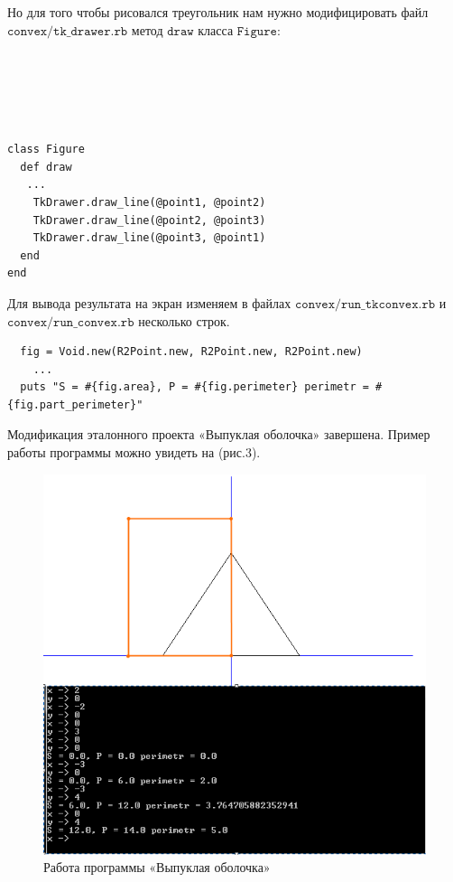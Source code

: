 Но для того чтобы рисовался треугольник нам нужно модифицировать файл $\texttt{convex/tk\_drawer.rb}$ 
метод $\texttt{draw}$ класса $\texttt{Figure}$:
\begin{small}
\begin{verbatim}





class Figure
  def draw
   ...
    TkDrawer.draw_line(@point1, @point2)
    TkDrawer.draw_line(@point2, @point3)
    TkDrawer.draw_line(@point3, @point1)
  end
end
\end{verbatim}
\end{small}

Для вывода результата на экран изменяем в файлах $\texttt{convex/run\_tkconvex.rb}$ и $\texttt{convex/run\_convex.rb}$ несколько строк.


\begin{small}
\begin{verbatim}
  fig = Void.new(R2Point.new, R2Point.new, R2Point.new)
    ...
  puts "S = #{fig.area}, P = #{fig.perimeter} perimetr = #{fig.part_perimeter}"
\end{verbatim}
\end{small}

Модификация эталонного проекта «Выпуклая оболочка» завершена. Пример работы программы можно увидеть на (рис.3).

\begin{figure}[ht!]
\begin{center}
\includegraphics[width=0.8\hsize]{images/3}
\end{center}
\caption{Работа программы «Выпуклая оболочка»}\label{fig:convex}
\end{figure}












